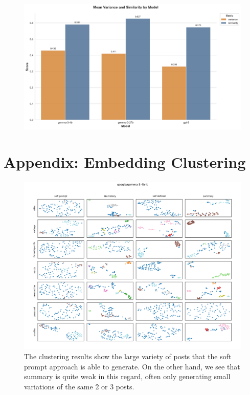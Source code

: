 \documentclass[11pt]{article}
\begin{document}
\begin{figure}[h]
    \centering
    \includegraphics[width=\linewidth]{visuals/model-variance-similarity.png}
    \caption{}
    \label{fig:clustering-gemma-3-4b}
\end{figure}
\clearpage
\section{Appendix: Embedding Clustering}

\begin{figure}[h]
    \centering
    \includegraphics[width=\linewidth]{visuals/clustering/embeddings_google-gemma-3-4b-it_page_1}
    \caption{The clustering results show the large variety of posts that the soft prompt approach is able to generate. On the other hand, we see that summary is quite weak in this regard, often only generating small variations of the same 2 or 3 posts.}
    \label{fig:clustering-gemma-3-4b}
\end{figure}
\end{document}
